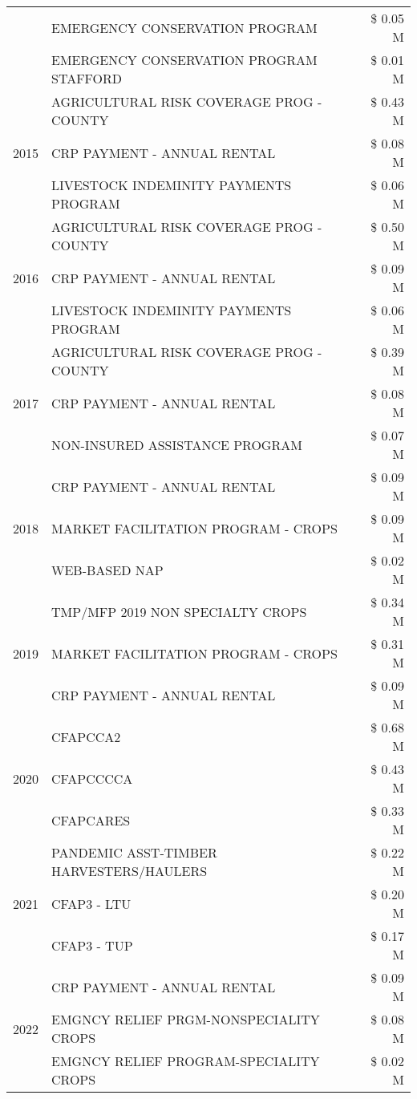 \begin{tabular}{llr}
 & EMERGENCY CONSERVATION PROGRAM & \$ 0.05 M \\
 & EMERGENCY CONSERVATION PROGRAM STAFFORD & \$ 0.01 M \\
\cline{1-3}
\multirow[t]{3}{*}{2015} & AGRICULTURAL RISK COVERAGE PROG - COUNTY & \$ 0.43 M \\
 & CRP PAYMENT - ANNUAL RENTAL & \$ 0.08 M \\
 & LIVESTOCK INDEMINITY PAYMENTS PROGRAM & \$ 0.06 M \\
\cline{1-3}
\multirow[t]{3}{*}{2016} & AGRICULTURAL RISK COVERAGE PROG - COUNTY & \$ 0.50 M \\
 & CRP PAYMENT - ANNUAL RENTAL & \$ 0.09 M \\
 & LIVESTOCK INDEMINITY PAYMENTS PROGRAM & \$ 0.06 M \\
\cline{1-3}
\multirow[t]{3}{*}{2017} & AGRICULTURAL RISK COVERAGE PROG - COUNTY & \$ 0.39 M \\
 & CRP PAYMENT - ANNUAL RENTAL & \$ 0.08 M \\
 & NON-INSURED ASSISTANCE PROGRAM & \$ 0.07 M \\
\cline{1-3}
\multirow[t]{3}{*}{2018} & CRP PAYMENT - ANNUAL RENTAL & \$ 0.09 M \\
 & MARKET FACILITATION PROGRAM - CROPS & \$ 0.09 M \\
 & WEB-BASED NAP & \$ 0.02 M \\
\cline{1-3}
\multirow[t]{3}{*}{2019} & TMP/MFP 2019 NON SPECIALTY CROPS & \$ 0.34 M \\
 & MARKET FACILITATION PROGRAM - CROPS & \$ 0.31 M \\
 & CRP PAYMENT - ANNUAL RENTAL & \$ 0.09 M \\
\cline{1-3}
\multirow[t]{3}{*}{2020} & CFAPCCA2 & \$ 0.68 M \\
 & CFAPCCCCA & \$ 0.43 M \\
 & CFAPCARES & \$ 0.33 M \\
\cline{1-3}
\multirow[t]{3}{*}{2021} & PANDEMIC ASST-TIMBER HARVESTERS/HAULERS & \$ 0.22 M \\
 & CFAP3 - LTU & \$ 0.20 M \\
 & CFAP3 - TUP & \$ 0.17 M \\
\cline{1-3}
\multirow[t]{3}{*}{2022} & CRP PAYMENT - ANNUAL RENTAL & \$ 0.09 M \\
 & EMGNCY RELIEF PRGM-NONSPECIALITY CROPS & \$ 0.08 M \\
 & EMGNCY RELIEF PROGRAM-SPECIALITY CROPS & \$ 0.02 M \\
\cline{1-3}
\bottomrule
\end{tabular}
